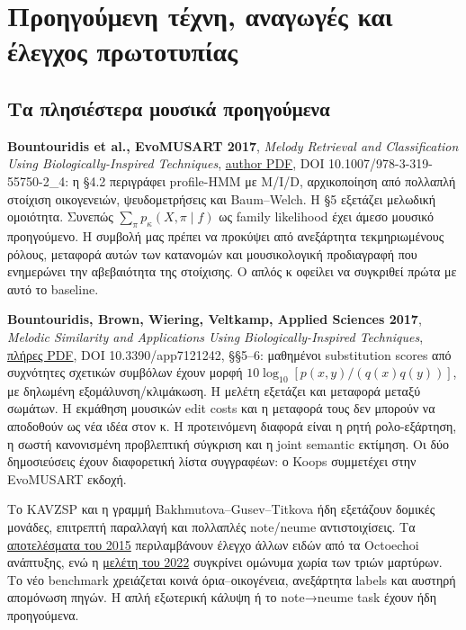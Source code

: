 \documentclass[
  10pt,
  a4paper,
]{report}
\begin{document}
\chapter{Προηγούμενη τέχνη, αναγωγές και έλεγχος
πρωτοτυπίας}\label{ux3c0ux3c1ux3bfux3b7ux3b3ux3bfux3cdux3bcux3b5ux3bdux3b7-ux3c4ux3adux3c7ux3bdux3b7-ux3b1ux3bdux3b1ux3b3ux3c9ux3b3ux3adux3c2-ux3baux3b1ux3b9-ux3adux3bbux3b5ux3b3ux3c7ux3bfux3c2-ux3c0ux3c1ux3c9ux3c4ux3bfux3c4ux3c5ux3c0ux3afux3b1ux3c2}

\section{Τα πλησιέστερα μουσικά
προηγούμενα}\label{ux3c4ux3b1-ux3c0ux3bbux3b7ux3c3ux3b9ux3adux3c3ux3c4ux3b5ux3c1ux3b1-ux3bcux3bfux3c5ux3c3ux3b9ux3baux3ac-ux3c0ux3c1ux3bfux3b7ux3b3ux3bfux3cdux3bcux3b5ux3bdux3b1}

\textbf{Bountouridis et al., EvoMUSART 2017}, \emph{Melody Retrieval and
Classification Using Biologically-Inspired Techniques},
\href{https://webspace.science.uu.nl/~veltk101/publications/art/evomusart2017-melody.pdf}{author
PDF}, DOI 10.1007/978-3-319-55750-2\_4: η §4.2 περιγράφει profile-HMM με
M/I/D, αρχικοποίηση από πολλαπλή στοίχιση οικογενειών, ψευδομετρήσεις
και Baum--Welch. Η §5 εξετάζει μελωδική ομοιότητα. Συνεπώς
\(\sum_\pi p_\kappa(X,\pi\mid f)\) ως family likelihood έχει άμεσο
μουσικό προηγούμενο. Η συμβολή μας πρέπει να προκύψει από ανεξάρτητα
τεκμηριωμένους ρόλους, μεταφορά αυτών των κατανομών και μουσικολογική
προδιαγραφή που ενημερώνει την αβεβαιότητα της στοίχισης. Ο απλός κ
οφείλει να συγκριθεί πρώτα με αυτό το baseline.

\textbf{Bountouridis, Brown, Wiering, Veltkamp, Applied Sciences 2017},
\emph{Melodic Similarity and Applications Using Biologically-Inspired
Techniques},
\href{https://webspace.science.uu.nl/~veltk101/publications/art/applsci-07-01242.pdf}{πλήρες
PDF}, DOI 10.3390/app7121242, §§5--6: μαθημένοι substitution scores από
συχνότητες σχετικών συμβόλων έχουν μορφή
\(10\log_{10}[p(x,y)/(q(x)q(y))]\), με δηλωμένη εξομάλυνση/κλιμάκωση. Η
μελέτη εξετάζει και μεταφορά μεταξύ σωμάτων. Η εκμάθηση μουσικών edit
costs και η μεταφορά τους δεν μπορούν να αποδοθούν ως νέα ιδέα στον κ. Η
προτεινόμενη διαφορά είναι η ρητή ρολο-εξάρτηση, η σωστή κανονισμένη
προβλεπτική σύγκριση και η joint semantic εκτίμηση. Οι δύο δημοσιεύσεις
έχουν διαφορετική λίστα συγγραφέων: ο Koops συμμετέχει στην EvoMUSART
εκδοχή.

Το KAVZSP και η γραμμή Bakhmutova--Gusev--Titkova ήδη εξετάζουν δομικές
μονάδες, επιτρεπτή παραλλαγή και πολλαπλές note/neume αντιστοιχίσεις. Τα
\href{https://doi.org/10.17674/1997-0854.2015.2.19.005-011}{αποτελέσματα
του 2015} περιλαμβάνουν έλεγχο άλλων ειδών από τα Octoechoi ανάπτυξης,
ενώ η \href{https://doi.org/10.17674/2782-3601.2022.4.098-106}{μελέτη
του 2022} συγκρίνει ομώνυμα χωρία των τριών μαρτύρων. Το νέο benchmark
χρειάζεται κοινά όρια--οικογένεια, ανεξάρτητα labels και αυστηρή
απομόνωση πηγών. Η απλή εξωτερική κάλυψη ή το note→neume task έχουν ήδη
προηγούμενα.
\end{document}
